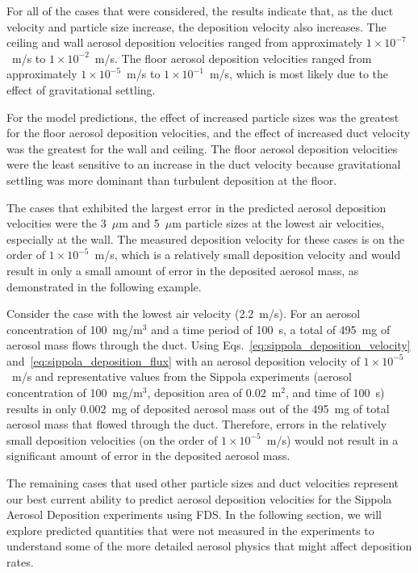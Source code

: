 For all of the cases that were considered, the results indicate that, as the duct velocity and particle size increase, the deposition velocity also increases. The ceiling and wall aerosol deposition velocities ranged from approximately $1 \times 10^{-7}$~m/s to $1 \times 10^{-2}$~m/s. The floor aerosol deposition velocities ranged from approximately $1 \times 10^{-5}$~m/s to $1 \times 10^{-1}$~m/s, which is most likely due to the effect of gravitational settling.

For the model predictions, the effect of increased particle sizes was the greatest for the floor aerosol deposition velocities, and the effect of increased duct velocity was the greatest for the wall and ceiling. The floor aerosol deposition velocities were the least sensitive to an increase in the duct velocity because gravitational settling was more dominant than turbulent deposition at the floor.

The cases that exhibited the largest error in the predicted aerosol deposition velocities were the 3~$\mu$m and 5~$\mu$m particle sizes at the lowest air velocities, especially at the wall. The measured deposition velocity for these cases is on the order of $1 \times 10^{-5}$~m/s, which is a relatively small deposition velocity and would result in only a small amount of error in the deposited aerosol mass, as demonstrated in the following example.

Consider the case with the lowest air velocity (2.2~m/s). For an aerosol concentration of 100~mg/m$^3$ and a time period of 100~s, a total of 495~mg of aerosol mass flows through the duct. Using Eqs.~\ref{eq:sippola_deposition_velocity} and~\ref{eq:sippola_deposition_flux} with an aerosol deposition velocity of $1 \times 10^{-5}$~m/s and representative values from the Sippola experiments (aerosol concentration of 100~mg/m$^3$, deposition area of 0.02~m$^2$, and time of 100~s) results in only 0.002~mg of deposited aerosol mass out of the 495~mg of total aerosol mass that flowed through the duct. Therefore, errors in the relatively small deposition velocities (on the order of $1 \times 10^{-5}$~m/s) would not result in a significant amount of error in the deposited aerosol mass.

The remaining cases that used other particle sizes and duct velocities represent our best current ability to predict aerosol deposition velocities for the Sippola Aerosol Deposition experiments using FDS. In the following section, we will explore predicted quantities that were not measured in the experiments to understand some of the more detailed aerosol physics that might affect deposition rates.

